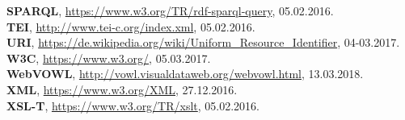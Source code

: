 \documentclass[12pt,a4paper]{article}
\begin{document}
\begin{singlespace}
\textbf{SPARQL}, \url{https://www.w3.org/TR/rdf-sparql-query}, 05.02.2016.
\\

\textbf{TEI}, \url{http://www.tei-c.org/index.xml}, 05.02.2016.
\\

\textbf{URI}, \url{https://de.wikipedia.org/wiki/Uniform_Resource_Identifier}, 04-03.2017.
\\

\textbf{W3C}, \url{https://www.w3.org/}, 05.03.2017.
\\

\textbf{WebVOWL}, \url{http://vowl.visualdataweb.org/webvowl.html}, 13.03.2018.
\\

\textbf{XML}, \url{https://www.w3.org/XML}, 27.12.2016.
\\

\textbf{XSL-T}, \url{https://www.w3.org/TR/xslt}, 05.02.2016.
\\

\end{singlespace}
\newpage
\listoffigures
\end{document}
